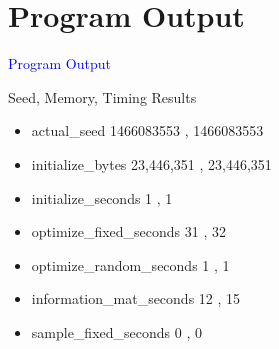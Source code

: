 \documentclass{beamer}
\newcommand{\Blue}[1]{\textcolor{blue}{#1}}
\newcommand{\Section}[1]{
	\section{#1}
	\begin{frame}
	\begin{center}
	\Blue{ \Large{#1} }
	\end{center}
	\end{frame}
}
\begin{document}
\Section{Program Output}
\begin{frame}{Seed, Memory, Timing Results}
\begin{itemize}

\item
actual\_seed
\hspace{5.9em} 1466083553 , 1466083553
\pause

\item
initialize\_bytes
\hspace{4.6em} 23,446,351 , 23,446,351
\pause

\item
initialize\_seconds
\hspace{3.6em} 1 , 1
\pause

\item
optimize\_fixed\_seconds
\hspace{1.3em} 31 , 32
\pause

\item
optimize\_random\_seconds
\hspace{0.05em} 1 , 1
\pause

\item
information\_mat\_seconds
\hspace{0.25em} 12 , 15
\pause

\item
sample\_fixed\_seconds
\hspace{1.9em} 0 , 0
\pause

\end{itemize}
\end{frame}
\end{document}
